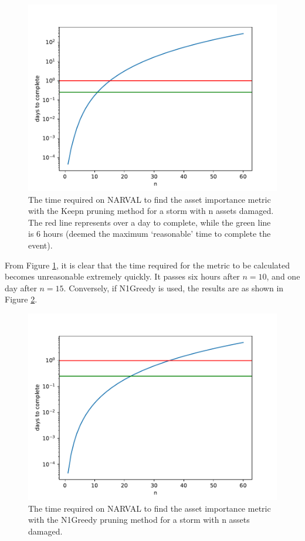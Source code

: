 \documentclass[12pt]{article}
\begin{document}
\begin{figure}[ht]
    \centering %
    \includegraphics[width=\textwidth]{Keepnnumsims.pdf}
    \caption[Time required to find importance metric with Keepn]{The time required on NARVAL to find the asset importance metric with the Keepn pruning method for a storm with n assets damaged. The red line represents over a day to complete, while the green line is 6 hours (deemed the maximum `reasonable' time to complete the event).}
    \label{fig:Keepnnumsims}
\end{figure}

From Figure \ref{fig:Keepnnumsims}, it is clear that the time required for the metric to be calculated becomes unreasonable extremely quickly. It passes six hours after $n = 10$, and one day after $n = 15$. Conversely, if N1Greedy is used, the results are as shown in Figure \ref{fig:Keep1numsims}. \par


\begin{figure}[ht]
    \centering %
    \includegraphics[width=\textwidth]{Keep1numsims.pdf}
    \caption[Time required to find importance metric with N1Greedy]{The time required on NARVAL to find the asset importance metric with the N1Greedy pruning method for a storm with n assets damaged.}
    \label{fig:Keep1numsims}
\end{figure}
\end{document}
